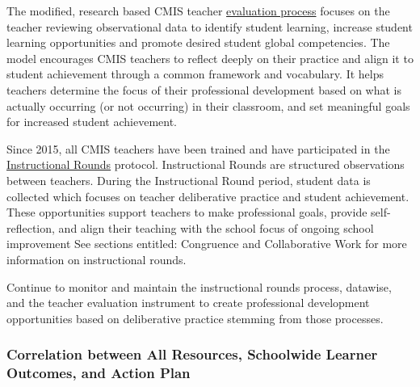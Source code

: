 \begin{findings}
The modified, research based CMIS teacher \href{https://docs.google.com/document/d/15_5X5QtixmWVheEUBVO9N1aislsLDm_ZW4-4g4YQ7F4/edit?usp=sharing}{evaluation process} focuses on the teacher reviewing observational data to identify student learning, increase student learning opportunities and promote desired student global competencies. The model encourages CMIS teachers to reflect deeply on their practice and align it to student achievement through a common framework and vocabulary. It helps teachers determine the focus of their professional development based on what is actually occurring (or not occurring) in their classroom, and set meaningful goals for increased student achievement. 

Since 2015, all CMIS teachers have been trained and have participated in the \href{https://drive.google.com/a/cmis.ac.th/file/d/0B0TYmzaZNi3fUzVFUEdzTURtakk/view?usp=sharing}{Instructional Rounds} protocol. Instructional Rounds are structured observations between teachers. During the Instructional Round period, student data is collected which focuses on teacher deliberative practice and student achievement. These opportunities support teachers to make professional goals, provide self-reflection, and align their teaching with the school focus of ongoing school improvement See sections entitled: Congruence and Collaborative Work for more information on instructional rounds. 


Continue to monitor and maintain the instructional rounds process, datawise, and the teacher evaluation instrument to create professional development opportunities based on deliberative practice stemming from those processes.
\end{findings}

\subsubsection{Correlation between All Resources, Schoolwide Learner Outcomes, and Action Plan}



